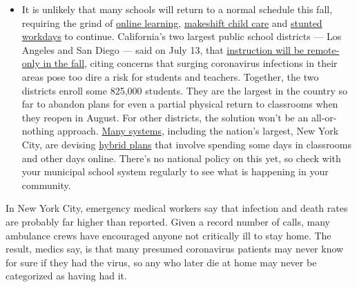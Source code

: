 \begin{itemize}
  \begin{itemize}
  \tightlist
  \item
    It is unlikely that many schools will return to a normal schedule
    this fall, requiring the grind of
    \href{https://www.nytimes.com/2020/06/05/us/coronavirus-education-lost-learning.html?action=click\&pgtype=Article\&state=default\&region=MAIN_CONTENT_3\&context=storylines_faq}{online
    learning},
    \href{https://www.nytimes.com/2020/05/29/us/coronavirus-child-care-centers.html?action=click\&pgtype=Article\&state=default\&region=MAIN_CONTENT_3\&context=storylines_faq}{makeshift
    child care} and
    \href{https://www.nytimes.com/2020/06/03/business/economy/coronavirus-working-women.html?action=click\&pgtype=Article\&state=default\&region=MAIN_CONTENT_3\&context=storylines_faq}{stunted
    workdays} to continue. California's two largest public school
    districts --- Los Angeles and San Diego --- said on July 13, that
    \href{https://www.nytimes.com/2020/07/13/us/lausd-san-diego-school-reopening.html?action=click\&pgtype=Article\&state=default\&region=MAIN_CONTENT_3\&context=storylines_faq}{instruction
    will be remote-only in the fall}, citing concerns that surging
    coronavirus infections in their areas pose too dire a risk for
    students and teachers. Together, the two districts enroll some
    825,000 students. They are the largest in the country so far to
    abandon plans for even a partial physical return to classrooms when
    they reopen in August. For other districts, the solution won't be an
    all-or-nothing approach.
    \href{https://bioethics.jhu.edu/research-and-outreach/projects/eschool-initiative/school-policy-tracker/}{Many
    systems}, including the nation's largest, New York City, are
    devising
    \href{https://www.nytimes.com/2020/06/26/us/coronavirus-schools-reopen-fall.html?action=click\&pgtype=Article\&state=default\&region=MAIN_CONTENT_3\&context=storylines_faq}{hybrid
    plans} that involve spending some days in classrooms and other days
    online. There's no national policy on this yet, so check with your
    municipal school system regularly to see what is happening in your
    community.
  \end{itemize}
\end{itemize}

In New York City, emergency medical workers say that infection and death
rates are probably far higher than reported. Given a record number of
calls, many ambulance crews have encouraged anyone not critically ill to
stay home. The result, medics say, is that many presumed coronavirus
patients may never know for sure if they had the virus, so any who later
die at home may never be categorized as having had it.

